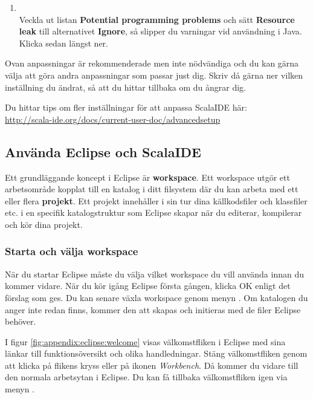 \begin{enumerate}
\item \EclipsePrefs{}
\\ Veckla ut listan \textbf{Potential programming problems} och sätt \textbf{Resource leak} till alternativet \textbf{Ignore}, så slipper du varningar vid användning  i Java. Klicka sedan  längst ner.

\end{enumerate}

\noindent Ovan anpassningar är rekommenderade men inte nödvändiga och du kan gärna välja att göra andra anpassningar som passar just dig. Skriv då gärna ner vilken inställning du ändrat, så att du hittar tillbaka om du ångrar dig. 

Du hittar tips om fler inställningar för att anpassa ScalaIDE här: \\
\url{http://scala-ide.org/docs/current-user-doc/advancedsetup}



\subsection{Använda Eclipse och ScalaIDE}\label{appendix:ide:eclipse:use}

Ett grundläggande koncept i Eclipse är \textbf{workspace}. Ett workspace utgör ett arbetsområde kopplat till en katalog i ditt filsystem där du kan arbeta med ett eller flera \textbf{projekt}. Ett projekt innehåller i sin tur dina källkodsfiler och klassfiler etc. i en specifik katalogstruktur som Eclipse skapar när du editerar, kompilerar och kör dina projekt. 

\subsubsection{Starta och välja workspace}\label{subsubsection:start:eclipse}

När du startar Eclipse måste du välja vilket workspace du vill använda innan du kommer vidare. När du kör igång Eclipse första gången, klicka OK enligt det förslag som ges. Du kan senare växla workspace genom menyn . Om katalogen du anger inte redan finns, kommer den att skapas och initieras med de filer Eclipse behöver.

I figur \ref{fig:appendix:eclipse:welcome} visas välkomstfliken i Eclipse med sina länkar till funktionsöversikt och olika handledningar. Stäng välkomstfliken genom att klicka på flikens kryss eller på ikonen \textit{Workbench}. Då kommer du vidare till den normala arbetsytan i Eclipse. Du kan få tillbaka välkomstfliken igen via menyn . 

